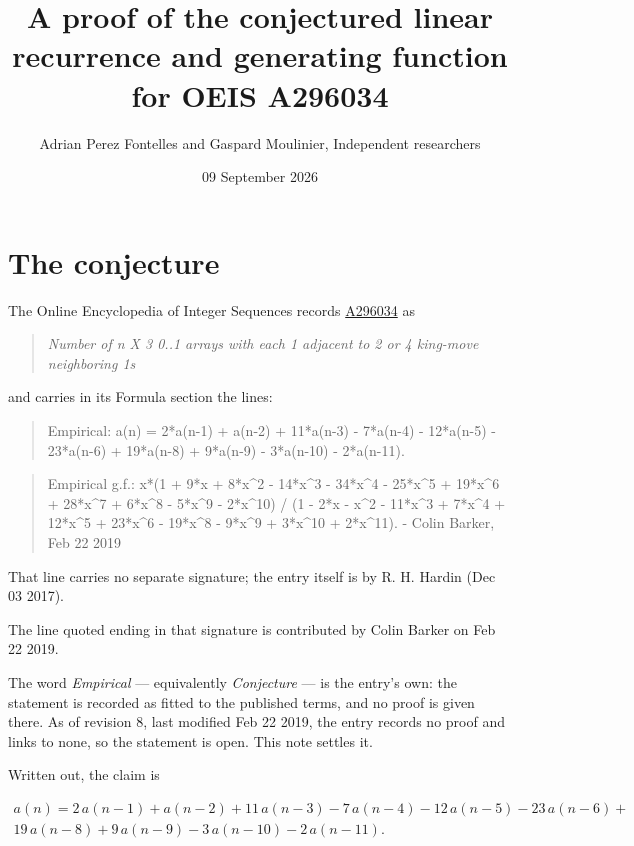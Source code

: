 \documentclass[11pt]{article}
\title{A proof of the conjectured linear recurrence and generating function for OEIS A296034}
\author{Adrian Perez Fontelles and Gaspard Moulinier, Independent researchers}
\date{09 September 2026}
\theoremstyle{definition}
\begin{document}
\maketitle
\section{The conjecture}

The Online Encyclopedia of Integer Sequences records \href{https://oeis.org/A296034}{A296034} as

\begin{quote}\itshape Number of n X 3 0..1 arrays with each 1 adjacent to 2 or 4 king-move neighboring 1s\end{quote}

and carries in its Formula section the lines:

\begin{quote}\ttfamily Empirical: a(n) = 2*a(n-1) + a(n-2) + 11*a(n-3) - 7*a(n-4) - 12*a(n-5) - 23*a(n-6) + 19*a(n-8) + 9*a(n-9) - 3*a(n-10) - 2*a(n-11).\end{quote}

\begin{quote}\ttfamily Empirical g.f.: x*(1 + 9*x + 8*x\textasciicircum{}2 - 14*x\textasciicircum{}3 - 34*x\textasciicircum{}4 - 25*x\textasciicircum{}5 + 19*x\textasciicircum{}6 + 28*x\textasciicircum{}7 + 6*x\textasciicircum{}8 - 5*x\textasciicircum{}9 - 2*x\textasciicircum{}10) / (1 - 2*x - x\textasciicircum{}2 - 11*x\textasciicircum{}3 + 7*x\textasciicircum{}4 + 12*x\textasciicircum{}5 + 23*x\textasciicircum{}6 - 19*x\textasciicircum{}8 - 9*x\textasciicircum{}9 + 3*x\textasciicircum{}10 + 2*x\textasciicircum{}11). - Colin Barker, Feb 22 2019\end{quote}

That line carries no separate signature; the entry itself is by R. H. Hardin (Dec 03 2017).

The line quoted ending in that signature is contributed by Colin Barker on Feb 22 2019.

The word {\itshape Empirical} --- equivalently {\itshape Conjecture} --- is the entry's own: the statement is recorded as fitted to the published terms, and no proof is given there. As of revision 8, last modified Feb 22 2019, the entry records no proof and links to none, so the statement is open. This note settles it.

Written out, the claim is

\begin{multline*} a(n) = 2\,a(n-1) + a(n-2) + 11\,a(n-3) - 7\,a(n-4) - 12\,a(n-5) - 23\,a(n-6) + \\ 19\,a(n-8) + 9\,a(n-9) - 3\,a(n-10) - 2\,a(n-11). \end{multline*}
\end{document}

